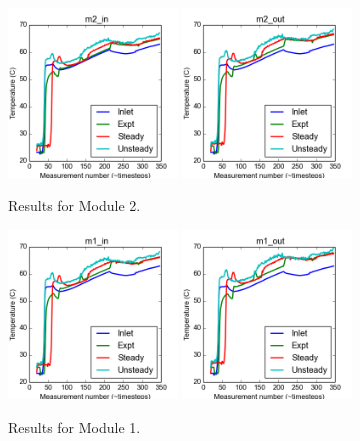 \documentclass{article}
\begin{document}
\clearpage
\begin{figure}[!ht]
\centering
\includegraphics[width=0.4\textwidth]{../../data/ICSolar/images/Feb6_m2_in_compare.png}\hspace{0.05\textwidth}
\includegraphics[width=0.4\textwidth]{../../data/ICSolar/images/Feb6_m2_out_compare.png}\hspace{0.05\textwidth}\\
\caption{Results for Module 2.}\end{figure}
\begin{figure}[!ht]
\centering
\includegraphics[width=0.4\textwidth]{../../data/ICSolar/images/Feb6_m1_in_compare.png}\hspace{0.05\textwidth}
\includegraphics[width=0.4\textwidth]{../../data/ICSolar/images/Feb6_m1_out_compare.png}\hspace{0.05\textwidth}\\
\caption{Results for Module 1.}\end{figure}
\end{document}
